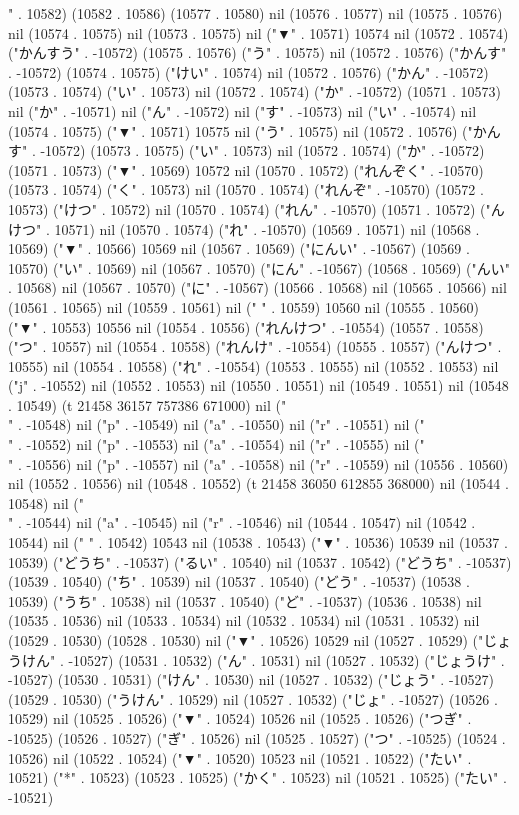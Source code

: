 " . 10582) (10582 . 10586) (10577 . 10580) nil (10576 . 10577) nil (10575 . 10576) nil (10574 . 10575) nil (10573 . 10575) nil ("▼" . 10571) 10574 nil (10572 . 10574) ("かんすう" . -10572) (10575 . 10576) ("う" . 10575) nil (10572 . 10576) ("かんす" . -10572) (10574 . 10575) ("けい" . 10574) nil (10572 . 10576) ("かん" . -10572) (10573 . 10574) ("い" . 10573) nil (10572 . 10574) ("か" . -10572) (10571 . 10573) nil ("か" . -10571) nil ("ん" . -10572) nil ("す" . -10573) nil ("い" . -10574) nil (10574 . 10575) ("▼" . 10571) 10575 nil ("う" . 10575) nil (10572 . 10576) ("かんす" . -10572) (10573 . 10575) ("い" . 10573) nil (10572 . 10574) ("か" . -10572) (10571 . 10573) ("▼" . 10569) 10572 nil (10570 . 10572) ("れんぞく" . -10570) (10573 . 10574) ("く" . 10573) nil (10570 . 10574) ("れんぞ" . -10570) (10572 . 10573) ("けつ" . 10572) nil (10570 . 10574) ("れん" . -10570) (10571 . 10572) ("んけつ" . 10571) nil (10570 . 10574) ("れ" . -10570) (10569 . 10571) nil (10568 . 10569) ("▼" . 10566) 10569 nil (10567 . 10569) ("にんい" . -10567) (10569 . 10570) ("い" . 10569) nil (10567 . 10570) ("にん" . -10567) (10568 . 10569) ("んい" . 10568) nil (10567 . 10570) ("に" . -10567) (10566 . 10568) nil (10565 . 10566) nil (10561 . 10565) nil (10559 . 10561) nil (" " . 10559) 10560 nil (10555 . 10560) ("▼" . 10553) 10556 nil (10554 . 10556) ("れんけつ" . -10554) (10557 . 10558) ("つ" . 10557) nil (10554 . 10558) ("れんけ" . -10554) (10555 . 10557) ("んけつ" . 10555) nil (10554 . 10558) ("れ" . -10554) (10553 . 10555) nil (10552 . 10553) nil ("j" . -10552) nil (10552 . 10553) nil (10550 . 10551) nil (10549 . 10551) nil (10548 . 10549) (t 21458 36157 757386 671000) nil ("\\" . -10548) nil ("p" . -10549) nil ("a" . -10550) nil ("r" . -10551) nil ("\\" . -10552) nil ("p" . -10553) nil ("a" . -10554) nil ("r" . -10555) nil ("\\" . -10556) nil ("p" . -10557) nil ("a" . -10558) nil ("r" . -10559) nil (10556 . 10560) nil (10552 . 10556) nil (10548 . 10552) (t 21458 36050 612855 368000) nil (10544 . 10548) nil ("\\" . -10544) nil ("a" . -10545) nil ("r" . -10546) nil (10544 . 10547) nil (10542 . 10544) nil (" " . 10542) 10543 nil (10538 . 10543) ("▼" . 10536) 10539 nil (10537 . 10539) ("どうち" . -10537) ("るい" . 10540) nil (10537 . 10542) ("どうち" . -10537) (10539 . 10540) ("ち" . 10539) nil (10537 . 10540) ("どう" . -10537) (10538 . 10539) ("うち" . 10538) nil (10537 . 10540) ("ど" . -10537) (10536 . 10538) nil (10535 . 10536) nil (10533 . 10534) nil (10532 . 10534) nil (10531 . 10532) nil (10529 . 10530) (10528 . 10530) nil ("▼" . 10526) 10529 nil (10527 . 10529) ("じょうけん" . -10527) (10531 . 10532) ("ん" . 10531) nil (10527 . 10532) ("じょうけ" . -10527) (10530 . 10531) ("けん" . 10530) nil (10527 . 10532) ("じょう" . -10527) (10529 . 10530) ("うけん" . 10529) nil (10527 . 10532) ("じょ" . -10527) (10526 . 10529) nil (10525 . 10526) ("▼" . 10524) 10526 nil (10525 . 10526) ("つぎ" . -10525) (10526 . 10527) ("ぎ" . 10526) nil (10525 . 10527) ("つ" . -10525) (10524 . 10526) nil (10522 . 10524) ("▼" . 10520) 10523 nil (10521 . 10522) ("たい" . 10521) ("*" . 10523) (10523 . 10525) ("かく" . 10523) nil (10521 . 10525) ("たい" . -10521) 